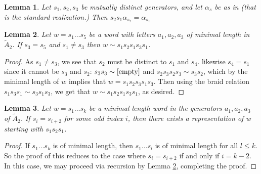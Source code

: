\documentclass{article}
\newtheorem{lemma}{Lemma}
\begin{document}
\begin{lemma}\label{lem:2Weyl1Root}
    Let $s_1, s_2, s_3$ be mutually distinct generators, and let $\alpha_{s}$ be as in \citet[p. 3]{casselman2008computationcoxetergroupsii} (that is the standard realization.) Then $s_2s_1\alpha_{s_2} = \alpha_{s_1}$
\end{lemma}
\begin{lemma}\label{lem:aba5LetterCase}
    Let $w = s_1\ldots s_5$ be a word with letters $a_1, a_2, a_3$ of minimal length in $\widetilde{A}_2$. If $s_3=s_5$ and $s_1 \neq s_3$ then $w\sim s_1s_2s_1s_3s_1$.
\end{lemma}
\begin{proof}
    As $s_1\neq s_3$, we see that $s_2$ must be distinct to $s_1$ and $s_4$. likewise $s_4=s_1$ since it cannot be $s_3$ and $s_2$: $s_3s_3\sim \textup{[empty]}$ and $s_2s_3s_2s_3 \sim s_3s_2$, which by the minimal length of $w$ implies that $w=s_1s_2s_3s_1s_3$. Then using the braid relation $s_1s_3s_1\sim s_3s_1s_3$, we get that $w\sim s_1s_2s_1s_3s_1$, as desired.
\end{proof}
\begin{lemma}\label{lem:abaGeneralCase}
    Let $w = s_1\ldots s_k$ be a minimal length word in the generators $a_1, a_2, a_3$ of  $\widetilde{A}_2$. If $s_i = s_{i+2}$ for some odd index $i$, then there exists a representation of $w$ starting with $s_1s_2s_1$. 
\end{lemma}
\begin{proof}
    If $s_1\ldots s_k$ is of minimal length, then $s_1\ldots s_l$ is of minimal length for all $l\leq k$. So the proof of this reduces to the case where $s_i=s_{i+2}$ if and only if $i=k-2$. In this case, we may proceed via recursion by Lemma \ref{lem:aba5LetterCase}, completing the proof. 
\end{proof}
\end{document}
